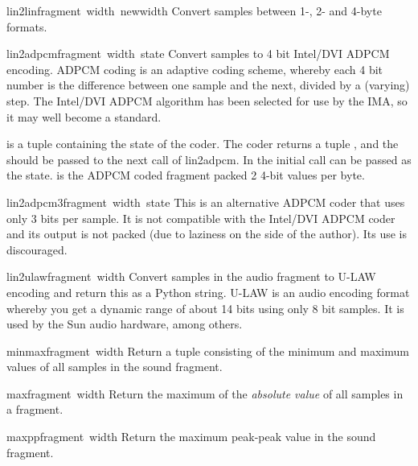 \begin{funcdesc}{lin2lin}{fragment\, width\, newwidth}
Convert samples between 1-, 2- and 4-byte formats.
\end{funcdesc}

\begin{funcdesc}{lin2adpcm}{fragment\, width\, state}
Convert samples to 4 bit Intel/DVI ADPCM encoding.  ADPCM coding is an
adaptive coding scheme, whereby each 4 bit number is the difference
between one sample and the next, divided by a (varying) step.  The
Intel/DVI ADPCM algorithm has been selected for use by the IMA, so it
may well become a standard.

 is a tuple containing the state of the coder.  The coder
returns a tuple , and the
 should be passed to the next call of lin2adpcm.  In the
initial call  can be passed as the state.  
is the ADPCM coded fragment packed 2 4-bit values per byte.
\end{funcdesc}

\begin{funcdesc}{lin2adpcm3}{fragment\, width\, state}
This is an alternative ADPCM coder that uses only 3 bits per sample.
It is not compatible with the Intel/DVI ADPCM coder and its output is
not packed (due to laziness on the side of the author).  Its use is
discouraged.
\end{funcdesc}

\begin{funcdesc}{lin2ulaw}{fragment\, width}
Convert samples in the audio fragment to U-LAW encoding and return
this as a Python string.  U-LAW is an audio encoding format whereby
you get a dynamic range of about 14 bits using only 8 bit samples.  It
is used by the Sun audio hardware, among others.
\end{funcdesc}

\begin{funcdesc}{minmax}{fragment\, width}
Return a tuple consisting of the minimum and maximum values of all
samples in the sound fragment.
\end{funcdesc}

\begin{funcdesc}{max}{fragment\, width}
Return the maximum of the {\em absolute value} of all samples in a
fragment.
\end{funcdesc}

\begin{funcdesc}{maxpp}{fragment\, width}
Return the maximum peak-peak value in the sound fragment.
\end{funcdesc}

